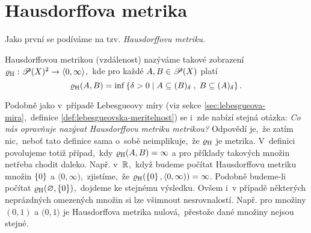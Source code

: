 \section{Hausdorffova metrika}\label{sec:hausdorffova-metrika}

Jako první se podíváme na tzv. \emph{Hausdorffovu metriku}.
\begin{definition}\label{def:hausdorffova-metrika}
    Hausdorffovou metrikou (vzdálenost) nazýváme takové zobrazení $\varrho_\textup{H}:\mathscr{P}(X)^2 \rightarrow \langle0,\infty\rangle$,~kde pro každé $A,B\in\mathscr{P}(X)$ platí
    \[\varrho_\textup{H}(A,B)=\inf\left\{\delta>0\;\middle|\;A\subseteq (B)_\delta\;,\;B\subseteq (A)_\delta\right\}.\]
\end{definition}
Podobně jako v~případě Lebesgueovy míry (viz sekce \ref{sec:lebesgueova-mira},~definice \ref{def:lebesgueovska-meritelnost}) se i~zde nabízí stejná otázka: \emph{Co nás opravňuje nazývat Hausdorffovu metriku metrikou?} Odpovědí je,~že zatím nic,~neboť tato definice sama o~sobě neimplikuje,~že $\varrho_\textup{H}$ je metrika. V~definici povolujeme totiž případ,~kdy $\varrho_\textup{H}(A,B)=\infty$ a pro příklady takových množin netřeba chodit daleko. Např. v~$\mathbb{R}$,~když budeme počítat Hausdorffovu metriku množin $\left\{0\right\}$ a $\langle 0,\infty)$,~zjistíme,~že $\varrho_\textup{H}(\left\{0\right\},\langle 0,\infty))=\infty$. Podobně budeme-li počítat $\varrho_\textup{H}(\varnothing,\left\{0\right\})$,~dojdeme ke stejnému výsledku. Ovšem i~v případě některých neprázdných omezených množin si lze všimnout nesrovnalostí. Např. pro množiny $(0,1)$ a $(0,1\rangle$ je Hausdorffova metrika nulová,~přestože dané množiny nejsou stejné.


